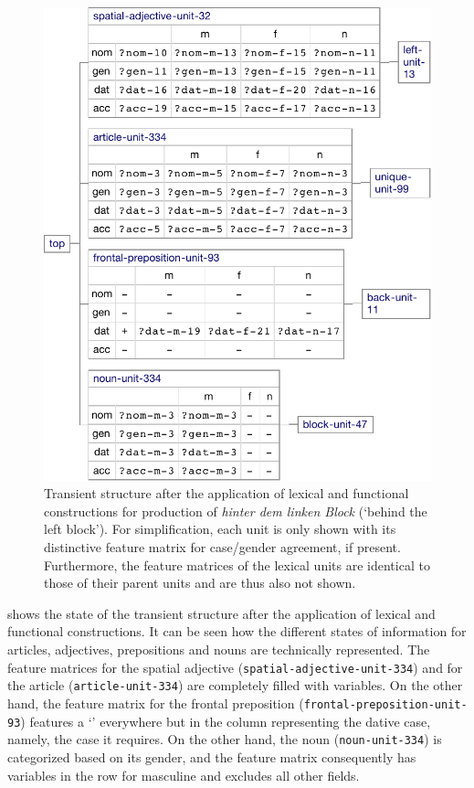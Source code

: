 \begin{figure}[t]
  \centerline{\includegraphics[scale=0.61]{figs/hinter-dem-linken-block-1}}
  \caption[Transient structure after the application of lexical and
    functional constructions]{Transient structure after the application of lexical and
    functional constructions for production of \textit{hinter dem linken
    Block} (`behind the left block'). For simplification, each unit
    is only shown with its distinctive feature matrix for case/gender
    agreement, if present. Furthermore, the feature matrices of the
    lexical units are identical to those of their parent units and are
    thus also not shown.}
  \label{f:hinter-dem-linken-block-1}
\end{figure}

 shows the state of the
transient structure after the application of lexical and functional
constructions. It can be seen how the different states of information
for articles, adjectives, prepositions and nouns are technically
represented. The feature matrices for the spatial adjective
({\footnotesize\texttt{spatial-adjective-unit-334}}) and for the article
({\footnotesize\texttt{article-unit-334}}) are completely filled with variables. On
the other hand, the feature matrix for the frontal preposition
({\footnotesize\texttt{frontal-preposition-unit-93}}) features a `{\textminus}' everywhere but
in the column representing the dative case, namely, the case it
requires. On the other hand, the noun ({\footnotesize\texttt{noun-unit-334}}) is
categorized based on its gender, and the feature matrix consequently
has variables in the row for masculine and excludes all other fields.

